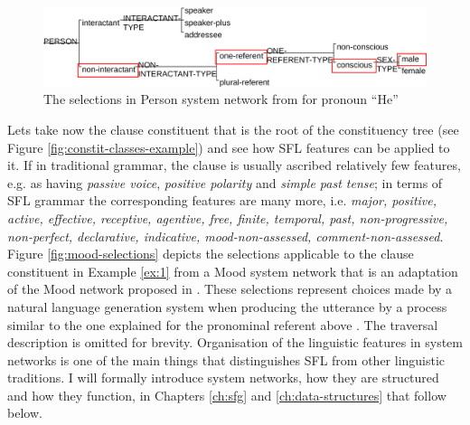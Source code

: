     \begin{figure}[!ht]
        \centering      
        \includegraphics[width=.90\textwidth]{Figures/Example/person-selections.pdf}      
        \caption{The selections in Person system network from \citet[366]{Halliday2013} for pronoun ``He''}
        \label{fig:person-system-network}
    \end{figure}
    
    
    Lets take now the clause constituent that is the root of the constituency tree (see Figure \ref{fig:constit-classes-example}) and see how SFL features can be applied to it. If in traditional grammar, the clause is usually ascribed relatively few features, e.g. as having \textit{passive voice}, \textit{positive polarity} and \textit{simple past tense}; in terms of SFL grammar the corresponding features are many more, i.e. \textit{major, positive, active, effective, receptive, agentive, free, finite, temporal, past, non-progressive, non-perfect, declarative, indicative, mood-non-assessed, comment-non-assessed}. Figure \ref{fig:mood-selections} depicts the selections applicable to the clause constituent in Example \ref{ex:1} from a Mood system network that is an adaptation of the Mood network proposed in \citet[162]{Halliday2013}. These selections represent choices made by a natural language generation system when producing the utterance by a process similar to the one explained for the pronominal referent above \citep{MatthiessenBateman91}. The traversal description is omitted for brevity. Organisation of the linguistic features in system networks is one of the main things that distinguishes SFL from other linguistic traditions. I will formally introduce system networks, how they are structured and how they function, in Chapters \ref{ch:sfg} and \ref{ch:data-structures} that follow below. 
    
